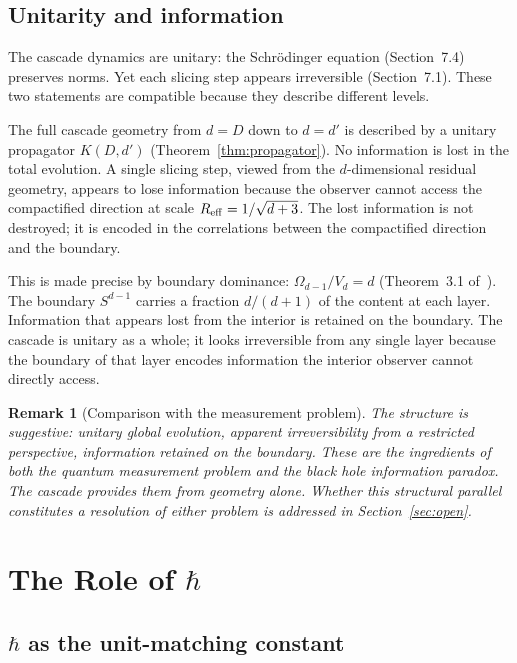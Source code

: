 \documentclass[12pt,a4paper]{article}
\newtheorem{remark}[theorem]{Remark}
\begin{document}
\subsection{Unitarity and information}

The cascade dynamics are unitary: the Schr\"{o}dinger equation (Section~7.4) preserves
norms. Yet each slicing step appears irreversible (Section~7.1). These two statements are
compatible because they describe different levels.

The full cascade geometry from $d=D$ down to $d=d'$ is described by a unitary propagator
$K(D,d')$ (Theorem~\ref{thm:propagator}). No information is lost in the total evolution.
A single slicing step, viewed from the $d$-dimensional residual geometry, appears to lose
information because the observer cannot access the compactified direction at scale
$R_{\rm eff}=1/\sqrt{d+3}$. The lost information is not destroyed; it is encoded in the
correlations between the compactified direction and the boundary.

This is made precise by boundary dominance: $\Omega_{d-1}/V_d=d$ (Theorem~3.1
of~\cite{paperI}). The boundary $S^{d-1}$ carries a fraction $d/(d+1)$ of the content at
each layer. Information that appears lost from the interior is retained on the boundary.
The cascade is unitary as a whole; it looks irreversible from any single layer because the
boundary of that layer encodes information the interior observer cannot directly access.

\begin{remark}[Comparison with the measurement problem]
The structure is suggestive: unitary global evolution, apparent irreversibility from a
restricted perspective, information retained on the boundary. These are the ingredients of
both the quantum measurement problem and the black hole information paradox. The cascade
provides them from geometry alone. Whether this structural parallel constitutes a resolution
of either problem is addressed in Section~\ref{sec:open}.
\end{remark}

\section{The Role of $\hbar$}
\label{sec:hbar}

\subsection{$\hbar$ as the unit-matching constant}
\end{document}

